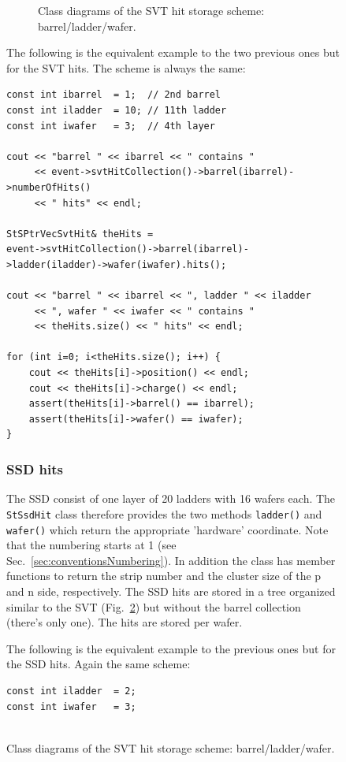 \documentclass[twoside]{article}
\begin{document}
\begin{figure}[htb]
\begin{center}
\begin{figure}[htb]
\begin{center}
        \caption{Class diagrams of the SVT hit storage scheme: barrel/ladder/wafer.}
        \label{fig:svt}
    \end{center}
\end{figure}

The following is the equivalent example to the two previous ones but for the SVT hits.
The scheme is always the same:
\begin{verbatim}
const int ibarrel  = 1;  // 2nd barrel
const int iladder  = 10; // 11th ladder
const int iwafer   = 3;  // 4th layer

cout << "barrel " << ibarrel << " contains "
     << event->svtHitCollection()->barrel(ibarrel)->numberOfHits()
     << " hits" << endl;

StSPtrVecSvtHit& theHits =
event->svtHitCollection()->barrel(ibarrel)->ladder(iladder)->wafer(iwafer).hits();

cout << "barrel " << ibarrel << ", ladder " << iladder
     << ", wafer " << iwafer << " contains "
     << theHits.size() << " hits" << endl;

for (int i=0; i<theHits.size(); i++) {
    cout << theHits[i]->position() << endl;
    cout << theHits[i]->charge() << endl;
    assert(theHits[i]->barrel() == ibarrel);
    assert(theHits[i]->wafer() == iwafer);
}

\end{verbatim}


\subsubsection{SSD hits}
   

The SSD consist of one layer of 20 ladders with 16 wafers each.  The
\texttt{StSsdHit} class therefore provides the two methods
\texttt{ladder()} and \texttt{wafer()} which return the appropriate
'hardware' coordinate. Note that the numbering starts at 1 (see
Sec.~\ref{sec:conventionsNumbering}).  In addition the class has
member functions to return the strip number and the cluster size of
the p and n side, respectively.  The SSD hits are stored in a tree
organized similar to the SVT (Fig.~\ref{fig:svt}) but without the
barrel collection (there's only one).  The hits are stored per wafer.

The following is the equivalent example to the previous ones but for the SSD hits.
Again the same scheme:
\begin{verbatim}
const int iladder  = 2;
const int iwafer   = 3;


\end{verbatim}
\end{center}
\end{figure}
\end{document}
